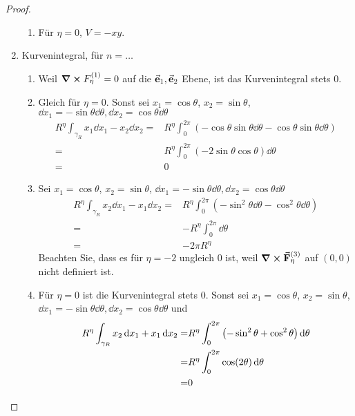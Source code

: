 \begin{proof}
\begin{enumerate}
\begin{enumerate}[label=(\arabic*)]
	\item F\"{u}r $\eta=0$, $V=-xy$.
	\end{enumerate}
\item Kurvenintegral, f\"{u}r $n=\dots$ 
	\begin{enumerate}[label=(\arabic*)]
		\item Weil $\curl{F_\eta^{(1)}}=0$ auf die $\va e_1, \va e_2$ Ebene, ist das Kurvenintegral stets $0$.
		\item Gleich f\"{u}r $\eta=0$. Sonst sei $x_1=\cos\theta$, $x_2=\sin\theta$, $\dd{x_1}=-\sin\theta\dd{\theta}, \dd{x_2}=\cos\theta\dd{\theta}$
			\begin{align*}
				R^\eta\int_{\gamma_R} x_1\dd{x_1}-x_2\dd{x_2}=&R^\eta \int_0^{2\pi} \left( -\cos\theta\sin\theta\dd{\theta}-\cos\theta\sin\theta\dd{\theta} \right)\\
				=& R^\eta\int_0^{2\pi}\left( -2\sin\theta\cos\theta \right) \dd{\theta}\\
				=& 0
			\end{align*}
		\item Sei $x_1=\cos\theta$, $x_2=\sin\theta$, $\dd{x_1}=-\sin\theta\dd{\theta}, \dd{x_2}=\cos\theta\dd{\theta}$
			\begin{align*}
				R^\eta\int_{\gamma_R}x_2\dd{x_1}-x_1\dd{x_2}=&R^\eta \int_0^{2\pi}\left( -\sin^2\theta\dd{\theta}-\cos^2\theta\dd{\theta} \right) \\
				=&-R^\eta \int_0^{2\pi} \dd{\theta}\\
				=&-2\pi R^\eta
			\end{align*}
			Beachten Sie, dass es f\"{u}r $\eta=-2$ ungleich $0$ ist, weil $\curl{\va F_\eta^{(3)}}$ auf $(0,0)$ nicht definiert ist.
		\item F\"{u}r $\eta=0$ ist die Kurvenintegral stets $0$. Sonst sei $x_1=\cos\theta$, $x_2=\sin\theta$, $\dd{x_1}=-\sin\theta\dd{\theta}, \dd{x_2}=\cos\theta\dd{\theta}$ und
			\begin{align*}
				R^\eta\int_{\gamma_R}x_2\dd{x_1}+x_1\dd{x_2}=& R^\eta \int_0^{2\pi} \left( -\sin^2\theta+\cos^2\theta \right)\dd{\theta} \\
				=&R^\eta \int_0^{2\pi}\cos(2\theta)\dd{\theta}\\
				=&0\qedhere
			\end{align*}
	\end{enumerate}
\end{enumerate}
\end{proof}
